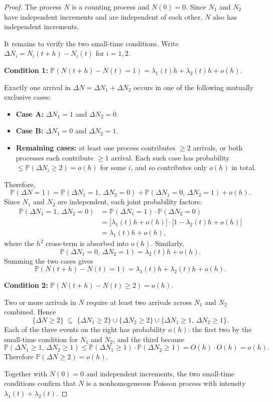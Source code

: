 \documentclass[11pt]{article}
\theoremstyle{plain}
\theoremstyle{definition}
\theoremstyle{remark}
\begin{document}
\begin{proof}
	The process \(N\) is a counting process and \(N(0)=0\). Since
	\(N_1\) and \(N_2\) have independent increments and are independent
	of each other, \(N\) also has independent increments.
	
	It remains to verify the two small-time conditions. Write
	\(\Delta N_i = N_i(t+h)-N_i(t)\) for \(i=1,2\).
	
	\medskip
	\noindent\textbf{Condition 1: } \(\mathbb{P}(N(t+h)-N(t)=1)
	=\lambda_1(t)h+\lambda_2(t)h+o(h)\).
	
	\medskip
	Exactly one arrival in \(\Delta N = \Delta N_1+\Delta N_2\) occurs
	in one of the following mutually exclusive cases:
	\begin{itemize}
		\item \textbf{Case A:} \(\Delta N_1=1\) and \(\Delta N_2=0\).
		\item \textbf{Case B:} \(\Delta N_1=0\) and \(\Delta N_2=1\).
		\item \textbf{Remaining cases:} at least one process contributes
		\(\ge 2\) arrivals, or both processes each contribute
		\(\ge 1\) arrival. Each such case has probability
		\(\le \mathbb{P}(\Delta N_i\ge 2)=o(h)\) for some \(i\),
		and so contributes only \(o(h)\) in total.
	\end{itemize}
	Therefore,
	\[
	\mathbb{P}(\Delta N=1)
	=
	\mathbb{P}(\Delta N_1=1,\,\Delta N_2=0)
	+
	\mathbb{P}(\Delta N_1=0,\,\Delta N_2=1)
	+o(h).
	\]
	Since \(N_1\) and \(N_2\) are independent, each joint probability
	factors:
	\begin{align*}
		\mathbb{P}(\Delta N_1=1,\,\Delta N_2=0)
		&= \mathbb{P}(\Delta N_1=1)\cdot\mathbb{P}(\Delta N_2=0) \\
		&= \bigl[\lambda_1(t)h+o(h)\bigr]
		\cdot\bigl[1-\lambda_2(t)h+o(h)\bigr] \\
		&= \lambda_1(t)h+o(h),
	\end{align*}
	where the \(h^2\) cross-term is absorbed into \(o(h)\). Similarly,
	\[
	\mathbb{P}(\Delta N_1=0,\,\Delta N_2=1)
	= \lambda_2(t)h+o(h).
	\]
	Summing the two cases gives
	\[
	\mathbb{P}(N(t+h)-N(t)=1)
	= \lambda_1(t)h+\lambda_2(t)h+o(h).
	\]
	
	\medskip
	\noindent\textbf{Condition 2: }
	\(\mathbb{P}(N(t+h)-N(t)\ge 2)=o(h)\).
	
	\medskip
	Two or more arrivals in \(N\) require at least two arrivals across
	\(N_1\) and \(N_2\) combined. Hence
	\[
	\{\Delta N\ge 2\}
	\;\subseteq\;
	\{\Delta N_1\ge 2\}\cup\{\Delta N_2\ge 2\}
	\cup\{\Delta N_1\ge 1,\,\Delta N_2\ge 1\}.
	\]
	Each of the three events on the right has probability \(o(h)\):
	the first two by the small-time condition for \(N_1\) and \(N_2\),
	and the third because
	\[
	\mathbb{P}(\Delta N_1\ge 1,\,\Delta N_2\ge 1)
	\le \mathbb{P}(\Delta N_1\ge 1)\cdot\mathbb{P}(\Delta N_2\ge 1)
	= O(h)\cdot O(h) = o(h).
	\]
	Therefore \(\mathbb{P}(\Delta N\ge 2)=o(h)\).
	
	\medskip
	Together with \(N(0)=0\) and independent increments, the two
	small-time conditions confirm that \(N\) is a nonhomogeneous
	Poisson process with intensity \(\lambda_1(t)+\lambda_2(t)\).
\end{proof}
\end{document}

